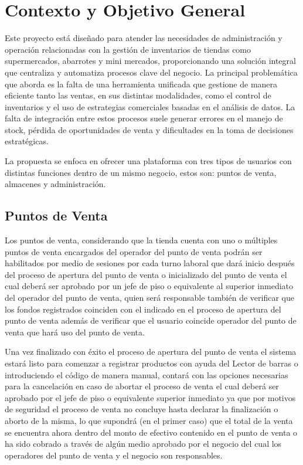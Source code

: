 \documentclass{article}
\begin{document}
\section{Contexto y Objetivo General}

Este proyecto está diseñado para atender las necesidades de administración y operación relacionadas con la gestión de inventarios de tiendas como supermercados, abarrotes y mini mercados, proporcionando una solución integral que centraliza y automatiza procesos clave del negocio. La principal problemática que aborda es la falta de una herramienta unificada que gestione de manera eficiente tanto las ventas, en sus distintas modalidades, como el control de inventarios y el uso de estrategias comerciales basadas en el análisis de datos. La falta de integración entre estos procesos suele generar errores en el manejo de stock, pérdida de oportunidades de venta y dificultades en la toma de decisiones estratégicas.

La propuesta se enfoca en ofrecer una plataforma con tres tipos de usuarios con distintas funciones dentro de un mismo negocio, estos son: puntos de venta, almacenes y administración. 

\subsection{Puntos de Venta}

Los puntos de venta, considerando que la tienda cuenta con uno o múltiples puntos de venta encargados del operador del punto de venta podrán ser habilitados por medio de sesiones por cada turno laboral que dará inicio después del proceso de apertura del punto de venta o inicializado del punto de venta el cual deberá ser aprobado por un jefe de piso o equivalente al superior inmediato del operador del punto de venta, quien será responsable también de verificar que los fondos registrados coinciden con el indicado en el proceso de apertura del punto de venta además de verificar que el usuario coincide operador del punto de venta que hará uso del punto de venta.

Una vez finalizado con éxito el proceso de apertura del punto de venta el sistema estará listo para comenzar a registrar productos con ayuda del Lector de barras o introduciendo el código de manera manual, contará con las opciones necesarias para la cancelación en caso de abortar el proceso de venta el cual deberá ser aprobado por el jefe de piso o equivalente superior inmediato ya que por motivos de seguridad el proceso de venta no concluye hasta declarar la finalización o aborto de la misma, lo que supondrá (en el primer caso) que el total de la venta se encuentra ahora dentro del monto de efectivo contenido en el punto de venta o ha sido cobrado a través de algún medio aprobado por el negocio del cual los operadores del punto de venta y el negocio son responsables.
\end{document}
